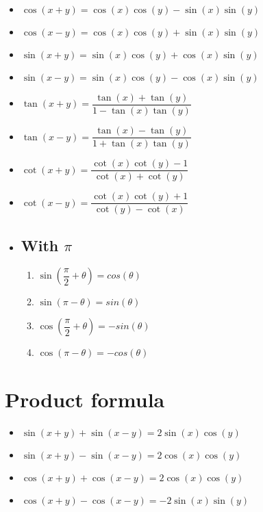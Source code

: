 \documentclass{article}
\begin{document}
\begin{itemize}
\item $\cos(x+y)=\cos(x)\cos(y)-\sin(x)\sin(y)$
\item $\cos(x-y)=\cos(x)\cos(y)+\sin(x)\sin(y)$
\item $\sin(x+y)=\sin(x)\cos(y)+\cos(x)\sin(y)$
\item $\sin(x-y)=\sin(x)\cos(y)-\cos(x)\sin(y)$
\item $\tan(x+y)=\dfrac{\tan(x)+\tan(y)}{1-\tan(x)\tan(y)}$
\item $\tan(x-y)=\dfrac{\tan(x)-\tan(y)}{1+\tan(x)\tan(y)}$
\item $\cot(x+y)=\dfrac{\cot(x)\cot(y)-1}{\cot(x)+\cot(y)}$
\item $\cot(x-y)=\dfrac{\cot(x)\cot(y)+1}{\cot(y)-\cot(x)}$
\item \subsection*{With $\pi$}
\begin{enumerate}
  \item $\sin(\dfrac{\pi}{2} + \theta) = cos(\theta)$
  \item $\sin(\pi - \theta) = sin(\theta)$
  \item $\cos(\dfrac{\pi}{2} + \theta) = -sin(\theta)$
  \item $\cos(\pi - \theta) = -cos(\theta)$
\end{enumerate}
\end{itemize}

\maketitle
\section {Product formula}
\begin{itemize}
  \item $\sin(x + y) + \sin(x - y) = 2\sin(x)\cos(y)$
  \item $\sin(x + y) - \sin(x - y) = 2\cos(x)\cos(y)$
  \item $\cos(x + y) + \cos(x - y) = 2\cos(x)\cos(y)$
  \item $\cos(x + y) - \cos(x - y) = -2\sin(x)\sin(y)$
\end{itemize}

\maketitle
\end{document}
